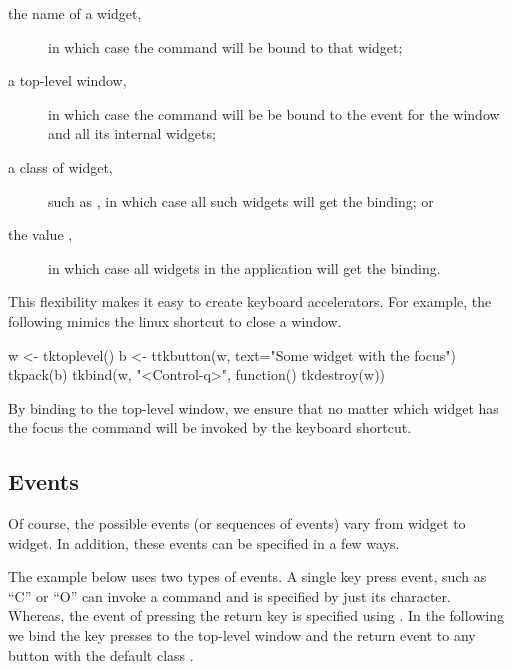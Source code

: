 \begin{description}
\item[the name of a widget,] in which case the command will be bound to that widget;
\item[a top-level window,] in which case the command will be be bound
  to the event for the window and all its internal widgets;
\item[a class of widget,] such as , in which case all
  such widgets will get the binding; or
\item[the value ,] in which case all widgets in the
  application will get the binding.
\end{description}

This flexibility makes it easy to create keyboard accelerators. For
example, the following mimics the linux shortcut  to
close a window.
\begin{Schunk}
\begin{Sinput}
 w <- tktoplevel()
 b <- ttkbutton(w, text="Some widget with the focus")
 tkpack(b)
 tkbind(w, "<Control-q>", function() tkdestroy(w))
\end{Sinput}
\end{Schunk}
%
By binding to the top-level window, we ensure that no matter which
widget has the focus the command will be invoked by the keyboard shortcut.


\subsection{Events}
\label{sec:tcltk:events}

Of course, the possible events (or sequences of events) vary from widget to
widget. In addition, these events can be specified in a few ways. 

The example below uses two types of events. A single key press event, such as
``C'' or ``O'' can invoke a command and is specified by just its
character. Whereas, the event of pressing the return key is specified
using . In the following we bind the key presses to the
top-level window and the return event to any button with the default
class .

